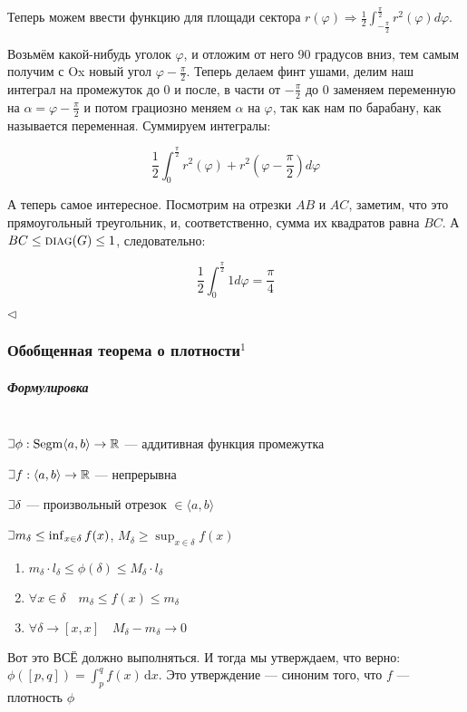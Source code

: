 \documentclass{article}
\def\letus{%
\mathord{\setbox0=\hbox{$\exists$}%
         \hbox{\kern 0.125\wd0%
               \vbox to \ht0{%
                  \hrule width 0.75\wd0%
                  \vfill%
                  \hrule width 0.75\wd0}%
               \vrule height \ht0%
               \kern 0.125\wd0}%
       }%
        }
\DeclareMathOperator{\segm}{Segm}
\def\D{\,\mathrm{d}}
\let\vanillasubparagraph\subparagraph
\renewcommand{\subparagraph}[1]{\vanillasubparagraph{#1}\mbox{}\\}
\begin{document}
Теперь можем ввести функцию для площади сектора $r(\varphi) \Rightarrow \frac{1}{2}\int_{-\frac{\pi}{2}}^{\frac{\pi}{2}}{r^2(\varphi)d\varphi}$.

Возьмём какой-нибудь уголок $\varphi$, и отложим от него 90 градусов вниз, тем самым получим с Ox новый угол $\varphi - \frac{\pi}{2}$. Теперь делаем финт ушами, делим наш интеграл на промежуток до 0 и после, в части от $-\frac{\pi}{2}$ до 0 заменяем переменную на $\alpha = \varphi - \frac{\pi}{2}$ и потом грациозно меняем $\alpha$ на $\varphi$, так как нам по барабану, как называется переменная. Суммируем интегралы:

\[\frac{1}{2}\int_0^{\frac{\pi}{2}}{r^2(\varphi) + r^2(\varphi - \frac{\pi}{2}) d\varphi}\]

А теперь самое интересное. Посмотрим на отрезки $AB$ и $AC$, заметим, что это прямоугольный треугольник, и, соответственно, сумма их квадратов равна $BC$. А $BC \le \textsc{diag}(G) \le 1$, следовательно:

\[\frac{1}{2}\int_0^{\frac{\pi}{2}}{1 d\varphi} = \frac{\pi}{4}\]

$\lhd$

\subsubsection{Обобщенная теорема о плотности\texorpdfstring{$^1$}{}}
\subparagraph{Формулировка}
$\letus \phi: \segm \langle a, b \rangle \rightarrow \mathbb{R}$ --- аддитивная функция промежутка

$\letus f: \langle a, b \rangle \rightarrow \mathbb{R}$ --- непрерывна

$\letus \delta$ --- произвольный отрезок $\in \langle a, b \rangle$

$\letus m_\delta \le \inf_{x\in \delta}f(x)$, $M_\delta \ge \sup_{x\in \delta}f(x)$

\begin{enumerate}
    \item $m_\delta \cdot l_\delta \le \phi(\delta) \le M_\delta \cdot l_\delta$
    \item $\forall x \in \delta \quad m_\delta \le f(x) \le m_\delta$
    \item $\forall \delta \rightarrow [x, x] \quad M_\delta - m_\delta \rightarrow 0$
\end{enumerate}

Вот это ВСЁ должно выполняться. И тогда мы утверждаем, что верно: $\phi([p, q]) = \int_p^q f(x)\D x$. Это утверждение --- синоним того, что $f$ --- плотность $\phi$
\end{document}
